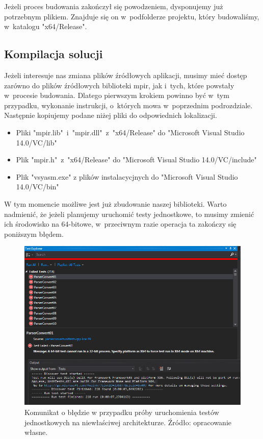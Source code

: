 Jeżeli proces budowania zakończył się powodzeniem, dysponujemy już potrzebnym plikiem. Znajduje się on w~podfolderze projektu, który budowaliśmy, w~katalogu "x64/Release".

\subsection{Kompilacja solucji}

Jeżeli interesuje nas zmiana plików źródłowych aplikacji, musimy mieć dostęp zarówno do plików źródłowych biblioteki mpir, jak i~tych, które powstały w~procesie budowania. Dlatego pierwszym krokiem powinno być w~tym przypadku, wykonanie instrukcji, o~których mowa w~poprzednim podrozdziale. Następnie kopiujemy podane niżej pliki do odpowiednich lokalizacji.

\begin{itemize}
	\item Pliki "mpir.lib"\ i~"mpir.dll"\ z~"x64/Release" do "Microsoft Visual Studio 14.0/VC/lib"
	\item Plik "mpir.h"\ z~"x64/Release" do "Microsoft Visual Studio 14.0/VC/include"
	\item Plik "vsyasm.exe" z plików instalacycjnych do "Microsoft Visual Studio 14.0/VC/bin"
\end{itemize}

W tym momencie możliwe jest już zbudowanie naszej biblioteki. Warto nadmienić, że jeżeli planujemy uruchomić testy jednostkowe, to musimy zmienić ich środowisko na 64-bitowe, w~przeciwnym razie operacja ta zakończy się poniższym błędem.

\begin{figure}[H]
	\includegraphics[width=15cm]{img/UnitTests_wrong_architecture.png}
	\caption{Komunikat o błędzie w przypadku próby uruchomienia testów jednostkowych na niewłaściwej architekturze. Źródło: opracowanie własne.}
\end{figure}


